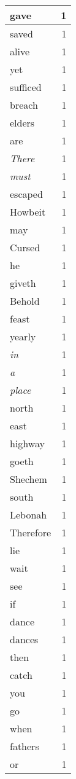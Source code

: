 \begin{center}
\begin{longtable}{l|r}
gave & 1 \\ \hline
saved & 1 \\ \hline
alive & 1 \\ \hline
yet & 1 \\ \hline
sufficed & 1 \\ \hline
breach & 1 \\ \hline
elders & 1 \\ \hline
are & 1 \\ \hline
\emph{There} & 1 \\ \hline
\emph{must} & 1 \\ \hline
escaped & 1 \\ \hline
Howbeit & 1 \\ \hline
may & 1 \\ \hline
Cursed & 1 \\ \hline
he & 1 \\ \hline
giveth & 1 \\ \hline
Behold & 1 \\ \hline
feast & 1 \\ \hline
yearly & 1 \\ \hline
\emph{in} & 1 \\ \hline
\emph{a} & 1 \\ \hline
\emph{place} & 1 \\ \hline
north & 1 \\ \hline
east & 1 \\ \hline
highway & 1 \\ \hline
goeth & 1 \\ \hline
Shechem & 1 \\ \hline
south & 1 \\ \hline
Lebonah & 1 \\ \hline
Therefore & 1 \\ \hline
lie & 1 \\ \hline
wait & 1 \\ \hline
see & 1 \\ \hline
if & 1 \\ \hline
dance & 1 \\ \hline
dances & 1 \\ \hline
then & 1 \\ \hline
catch & 1 \\ \hline
you & 1 \\ \hline
go & 1 \\ \hline
when & 1 \\ \hline
fathers & 1 \\ \hline
or & 1 \\ \hline

\end{longtable}
\end{center}
